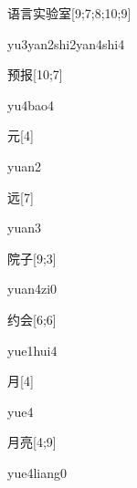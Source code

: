 \begin{verbete}{语言实验室}[9;7;8;10;9]
\begin{pronuncia}[\\]{yu3yan2shi2yan4shi4}
\end{pronuncia}
\end{verbete}

\begin{verbete}[yu4bao4]{预报}[10;7]
\begin{pronuncia}{yu4bao4}
\end{pronuncia}
\end{verbete}

\begin{verbete}[yuan2]{元}[4]
\begin{pronuncia}{yuan2}
\end{pronuncia}
\end{verbete}

\begin{verbete}[yuan3]{远}[7]
\begin{pronuncia}{yuan3}
\end{pronuncia}
\end{verbete}

\begin{verbete}[yuan4zi0]{院子}[9;3]
\begin{pronuncia}{yuan4zi0}
\end{pronuncia}
\end{verbete}

\begin{verbete}{约会}[6;6]
\begin{pronuncia}{yue1hui4}
\end{pronuncia}
\end{verbete}

\begin{verbete}[yue4]{月}[4]
\begin{pronuncia}{yue4}
\end{pronuncia}
\end{verbete}

\begin{verbete}{月亮}[4;9]
\begin{pronuncia}{yue4liang0}
\end{pronuncia}
\end{verbete}

